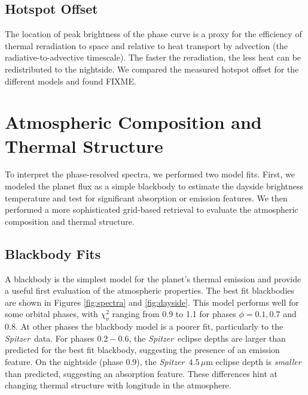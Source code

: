 \documentclass[twocolumn]{aastex61}
\newcommand{\project}[1]{\textsl{#1}}
\newcommand{\Spitzer}{\project{Spitzer}}
\begin{document}



\subsection{Hotspot Offset}
The location of peak brightness of the phase curve is a proxy for the efficiency of thermal reradiation to space and relative to heat transport by advection (the radiative-to-advective timescale). The faster the reradiation, the less heat can be redistributed to the nightside. We compared the measured hotspot offset for the different models and found FIXME.



\section{Atmospheric Composition and Thermal Structure}
\label{sec:composition}
To interpret the phase-resolved spectra, we performed two model fits. First, we modeled the planet flux as a simple blackbody to estimate the dayside brightness temperature and test for significant absorption or emission features. We then performed a more sophisticated grid-based retrieval to evaluate the atmospheric composition and thermal structure. 

\subsection{Blackbody Fits}
A blackbody is the simplest model for the planet's thermal emission and provide a useful first evaluation of the atmospheric properties. The best fit blackbodies are shown in Figures \ref{fig:spectra} and \ref{fig:dayside}. This model performs well for some orbital phases, with $\chi^2_\nu$ ranging from 0.9 to 1.1 for phases $\phi = 0.1, 0.7$ and $0.8$. At other phases the blackbody model is a poorer fit, particularly to the \Spitzer\ data. For phases $0.2 - 0.6$, the \Spitzer\ eclipse depths are larger than predicted for the best fit blackbody, suggesting the presence of an emission feature. On the nightside (phase $0.9$), the \Spitzer\ $4.5\,\mu$m eclipse depth is \emph{smaller} than predicted, suggesting an absorption feature. These differences hint at changing thermal structure with longitude in the atmosphere.
\end{document}
